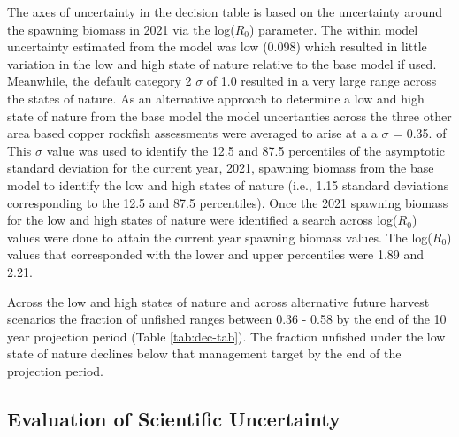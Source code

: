 \documentclass[11pt,
  english,
  a4paper,
]{article}
\begin{document}
The axes of uncertainty in the decision table is based on the uncertainty around the spawning biomass in 2021 via the log({\(R_0\)\leavevmode\tagmcend\tagstructend}) parameter. The within model uncertainty estimated from the model was low (0.098) which resulted in little variation in the low and high state of nature relative to the base model if used. Meanwhile, the default category 2 {\(\sigma\)\leavevmode\tagmcend\tagstructend} of 1.0 resulted in a very large range across the states of nature. As an alternative approach to determine a low and high state of nature from the base model the model uncertanties across the three other area based copper rockfish assessments were averaged to arise at a a {\(\sigma\)\leavevmode\tagmcend\tagstructend} = 0.35. of This {\(\sigma\)\leavevmode\tagmcend\tagstructend} value was used to identify the 12.5 and 87.5 percentiles of the asymptotic standard deviation for the current year, 2021, spawning biomass from the base model to identify the low and high states of nature (i.e., 1.15 standard deviations corresponding to the 12.5 and 87.5 percentiles). Once the 2021 spawning biomass for the low and high states of nature were identified a search across log({\(R_0\)\leavevmode\tagmcend\tagstructend}) values were done to attain the current year spawning biomass values. The log({\(R_0\)\leavevmode\tagmcend\tagstructend}) values that corresponded with the lower and upper percentiles were 1.89 and 2.21.

\leavevmode\tagmcend\tagstructend\par


Across the low and high states of nature and across alternative future harvest scenarios the fraction of unfished ranges between 0.36 - 0.58 by the end of the 10 year projection period (Table \ref{tab:dec-tab}). The fraction unfished under the low state of nature declines below that management target by the end of the projection period.

\leavevmode\tagmcend\tagstructend\par


\hypertarget{evaluation-of-scientific-uncertainty}{%
\subsection{Evaluation of Scientific Uncertainty}\label{evaluation-of-scientific-uncertainty}}
\end{document}
